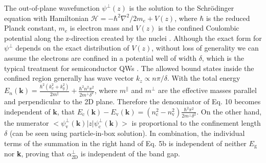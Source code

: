 \documentclass[manuscript=suppinfo,email=true,hyperref=true,keywords=false]{achemso}
\begin{document}
The out-of-plane wavefunction $\psi^{\perp}(z)$ is the solution to the Schr\"{o}dinger equation with
Hamiltonian $\mathcal{H} = -\hbar^{2} \nabla^{2}/2m_{e} + V(z)$, where
$\hbar$ is the reduced Planck constant, $m_{e}$ is electron mass and
$V(z)$ is the confined Coulombic potential along the z-direction
created by the nuclei
\cite{davies_physics_1997,ihn_semiconductor_2009}. Although the exact
form for $\psi^{\perp}$ depends on the exact distribution of $V(z)$,
without loss of generality we can assume the electrons are confined in
a potential well of width $\delta$, which is the typical treatment for
semiconductor QWs \cite{ihn_semiconductor_2009}. The allowed bound
states inside the confined region generally has wave vector
$k_{z} \propto n \pi / \delta$. With the total energy
$E_{n}(\mathbf{k}) = {\displaystyle \frac{\hbar^{2} (k_{x}^{2} +
    k_{y}^{2})}{2 m^{\parallel}} + \frac{\hbar^{2} n^{2} \pi^{2}}{2
    m^{\perp} \delta^{2}}}$, where $m^{\parallel}$ and $m^{\perp}$ are
the effective masses parallel and perpendicular to the 2D
plane. Therefore the denominator of Eq. 10 becomes independent of
$\mathbf{k}$, that
$E_{\mathrm{c}}(\mathbf{k}) - E_{\mathrm{v}}(\mathbf{k}) =
(n_{\mathrm{c}}^{2} - n_{\mathrm{v}}^{2}) {\displaystyle
  \frac{\hbar^{2} \pi^{2}}{2 m^{\perp} \delta^{2}}}$. On the other
hand, the numerator
$<\psi^{\perp}_{\mathrm{v}}(\mathbf{k})|z|\psi^{\perp}_{\mathrm{c}}(\mathbf{k})>$
is proportional to the confinement length $\delta$ (can be seen using
particle-in-box solution\cite{davies_physics_1997}). In combination,
the individual terms of the summation in the right hand of Eq. 5b is
independent of neither $E_{\mathrm{g}}$ nor \textbf{k}, proving that
$\alpha_{\mathrm{2D}}^{\perp}$ is independent of the band gap.
\end{document}
